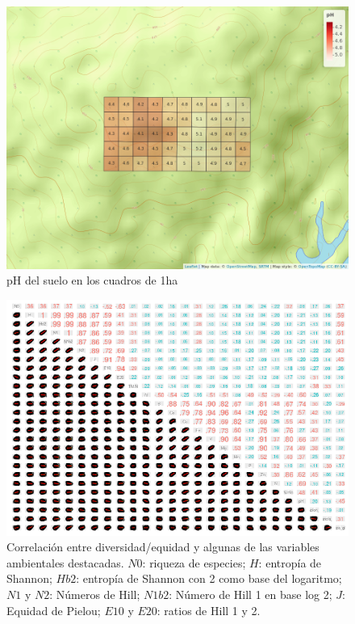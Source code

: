 \documentclass[11pt,]{article}
\begin{document}
\begin{figure}
\centering
\includegraphics{mapa_cuadros_ph.png}
\caption{pH del suelo en los cuadros de 1ha \label{fig:mapa_cuadros_ph}}
\end{figure}

\begin{figure}
\centering
\includegraphics{panel_cor_indcs_diversidad1_columnas_quitadas.png}
\caption{Correlación entre diversidad/equidad y algunas de las variables
ambientales destacadas. \(N0\): riqueza de especies; \(H\): entropía de
Shannon; \(Hb2\): entropía de Shannon con 2 como base del logaritmo;
\(N1\) y \(N2\): Números de Hill; \(N1b2\): Número de Hill 1 en base log
2; \(J\): Equidad de Pielou; \(E10\) y \(E20\): ratios de Hill 1 y 2.
\label{fig:panel_cor_indics_diversidad1_columnnas_quitadas}}
\end{figure}
\end{document}
